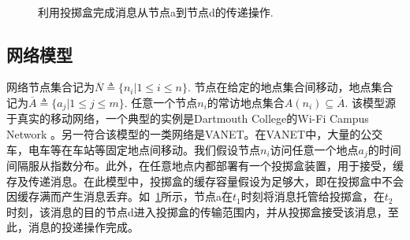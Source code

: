 \begin{figure}
\centering
{}~~~~~~
\caption{利用投掷盒完成消息从节点a到节点d的传递操作.}
\label{fig:chap3_box}
\end{figure}

\subsection{网络模型}

网络节点集合记为$\overline{N}\triangleq\{n_i|1\leq i\leq n\}$. 节点在给定的地点集合间移动，地点集合记为$\overline{A}\triangleq\{a_j|1\leq j \leq m\}$. 任意一个节点$n_i$的常访地点集合$A(n_i)\subseteq \overline{A}$. 该模型源于真实的移动网络，一个典型的实例是Dartmouth College的Wi-Fi Campus Network \cite{Jedari:2013uo}。另一符合该模型的一类网络是VANET。在VANET中，大量的公交车，电车等在车站等固定地点间移动。我们假设节点$n_i$访问任意一个地点$a_j$的时间间隔服从指数分布。此外，在任意地点内都部署有一个投掷盒装置，用于接受，缓存及传递消息。在此模型中，投掷盒的缓存容量假设为足够大，即在投掷盒中不会因缓存满而产生消息丢弃。如\figurename~\ref{fig:chap3_box}所示，节点a在$t_1$时刻将消息托管给投掷盒，在$t_2$时刻，该消息的目的节点d进入投掷盒的传输范围内，并从投掷盒接受该消息，至此，消息的投递操作完成。

